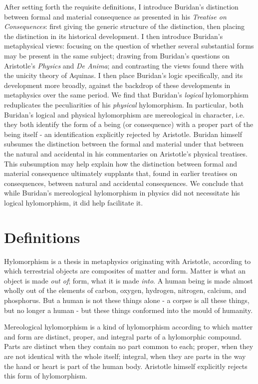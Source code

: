 \documentclass[]{article}
\begin{document}
After setting forth the requisite definitions, I introduce Buridan's distinction between formal and material consequence as presented in his \textit{Treatise on Consequences}: first giving the generic structure of the distinction, then placing the distinction in its historical development. I then introduce Buridan's metaphysical views: focusing on the question of whether several substantial forms may be present in the same subject; drawing from Buridan's questions on Aristotle's \textit{Physics} and \textit{De Anima}; and contrasting the views found there with the unicity theory of Aquinas. I then place Buridan's logic specifically, and its development more broadly, against the backdrop of these developments in metaphysics over the same period. We find that Buridan's \textit{logical} hylomorphism reduplicates the peculiarities of his \textit{physical} hylomorphism. In particular, both Buridan's logical and physical hylomorphism are mereological in character, i.e. they both identify the form of a being (or consequence) with a proper part of the being itself - an identification explicitly rejected by Aristotle. Buridan himself subsumes the distinction between the formal and material under that between the natural and accidental in his commentaries on Aristotle's physical treatises. This subsumption may help explain how the distinction between formal and material consequence ultimately supplants that, found in earlier treatises on consequences, between natural and accidental consequences. We conclude that while Buridan's mereological hylomorphism in physics did not necessitate his logical hylomorphism, it did help facilitate it.
\section{Definitions}
Hylomorphism is a thesis in metaphysics originating with Aristotle, according to which terrestrial objects are composites of matter and form. Matter is what an object is made \textit{out of}; form, what it is made \textit{into}. A human being is made almost wholly out of the elements of carbon, oxygen, hydrogen, nitrogen, calcium, and phosphorus. But a human is not these things alone - a corpse is all these things, but no longer a human - but these things conformed into the mould of humanity.
	
Mereological hylomorphism is a kind of hylomorphism according to which matter and form are distinct, proper, and integral parts of a hylomorphic compound. Parts are distinct when they contain no part common to each; proper, when they are not identical with the whole itself; integral, when they are parts in the way the hand or heart is part of the human body. Aristotle himself explicitly rejects this form of hylomorphism.\autocite[Bk. VII. 10, pp. 1034b 33-36a 25]{Metaph}
\end{document}
